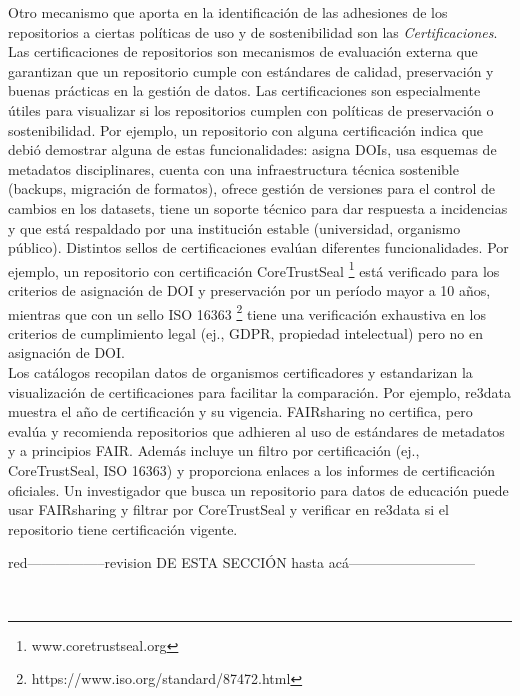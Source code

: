 \documentclass[runningheads]{llncs}
\def \bchregi {\begin{color}{red}}
\def \echregi {\end{color}}
\begin{document}
Otro mecanismo que aporta en la identificación de las adhesiones de los repositorios a ciertas políticas de uso y de sostenibilidad son las \emph{Certificaciones}. Las certificaciones de repositorios son mecanismos de evaluación externa que garantizan que un repositorio cumple con estándares de calidad, preservación y buenas prácticas en la gestión de datos. Las certificaciones son especialmente útiles para visualizar si los repositorios cumplen con políticas de preservación o sostenibilidad. Por ejemplo, un repositorio con alguna certificación indica que debió demostrar alguna de estas funcionalidades: asigna DOIs, usa esquemas de metadatos disciplinares,  cuenta con una infraestructura técnica sostenible (backups, migración de formatos), ofrece gestión de versiones para el control de cambios en los datasets, tiene un soporte técnico para dar respuesta a incidencias y que está respaldado por una institución estable (universidad, organismo público). Distintos sellos de certificaciones evalúan diferentes funcionalidades. Por ejemplo, un repositorio con certificación CoreTrustSeal \footnote{ www.coretrustseal.org} está verificado para los criterios de asignación de DOI y preservación por un período mayor a 10 años, mientras que con un sello ISO 16363 \footnote{https://www.iso.org/standard/87472.html} tiene una verificación exhaustiva en los criterios de cumplimiento legal (ej., GDPR, propiedad intelectual) pero no en asignación de DOI.\\



Los catálogos recopilan datos de organismos certificadores y estandarizan la visualización de certificaciones para facilitar la comparación. Por ejemplo, re3data muestra el año de certificación y su vigencia.  FAIRsharing no certifica, pero evalúa y recomienda repositorios que adhieren al uso de estándares de metadatos y a principios FAIR. Además incluye un filtro por certificación (ej., CoreTrustSeal, ISO 16363) y proporciona enlaces a los informes de certificación oficiales. Un investigador que busca un repositorio para datos de educación puede usar FAIRsharing y filtrar por CoreTrustSeal y verificar en re3data si el repositorio tiene certificación vigente.




\bchregi -----------------revision DE ESTA SECCIÓN hasta acá--------------------------- \echregi \\
\end{document}
